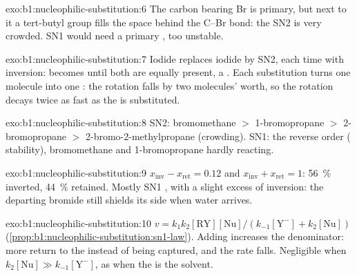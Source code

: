 \begin{solution}{exo:b1:nucleophilic-substitution:6}
The carbon bearing Br is primary, but next to it a tert-butyl group fills
the space behind the C--Br bond: the SN2  is very
crowded. SN1 would need a primary , too unstable.
\end{solution}

\begin{solution}{exo:b1:nucleophilic-substitution:7}
Iodide replaces iodide by SN2, each time with inversion:  becomes
 until both are equally present, a . Each
substitution turns one  molecule into one : the rotation
falls by two molecules' worth, so the rotation decays twice as fast as
the  is substituted.
\end{solution}

\begin{solution}{exo:b1:nucleophilic-substitution:8}
SN2: bromomethane $>$ 1-bromopropane $>$ 2-bromopropane $>$
2-bromo-2-methylpropane (crowding). SN1: the reverse order (
stability), bromomethane and 1-bromopropane hardly reacting.
\end{solution}

\begin{solution}{exo:b1:nucleophilic-substitution:9}
$x_{\text{inv}} - x_{\text{ret}} = 0.12$ and $x_{\text{inv}} + x_{\text{ret}} = 1$:
\qty{56}{\percent} inverted, \qty{44}{\percent} retained. Mostly SN1
, with a slight excess of inversion: the departing bromide
still shields its side when water arrives.
\end{solution}

\begin{solution}{exo:b1:nucleophilic-substitution:10}
$v = k_1k_2[\mathrm{RY}][\mathrm{Nu}]/(k_{-1}[\mathrm{Y^-}] + k_2[\mathrm{Nu}])$
(\cref{prop:b1:nucleophilic-substitution:sn1-law}). Adding 
increases the denominator: more  return to the 
instead of being captured, and the rate falls. Negligible when
$k_2[\mathrm{Nu}] \gg k_{-1}[\mathrm{Y^-}]$, as when the  is the
solvent.
\end{solution}

